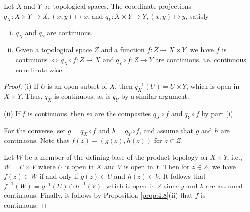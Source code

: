 \documentclass[a4paper,11pt]{article}
\begin{document}
\begin{proposition}\label{prop:4.9}
    Let $X$ and $Y$ be topological spaces. The coordinate projections $q_{X}: X \times Y \rightarrow X,(x, y) \mapsto x$, and $q_{Y}: X \times Y \rightarrow Y,(x, y) \mapsto y$, satisfy

    \begin{enumerate}[(i)]
        \item $q_{X}$ and $q_{Y}$ are continuous.

        \item Given a topological space $Z$ and a function $f: Z \rightarrow X \times Y$, we have $f$ is continuous $\Longleftrightarrow q_{X} \circ f: Z \rightarrow X$ and $q_{Y} \circ f: Z \rightarrow Y$ are continuous. i.e. continuous coordinate-wise. 
    \end{enumerate}
\end{proposition}
\begin{proof}
    (i) If $U$ is an open subset of $X$, then $q_{X}^{-1}(U)=U \times Y$, which is open in $X \times Y$. Thus, $q_{X}$ is continuous, as is $q_{Y}$ by a similar argument.

    (ii) If $f$ is continuous, then so are the composites $q_X \circ f$ and $q_{Y} \circ f$ by part (i). 
    
    For the converse, set $g=q_{X} \circ f$ and $h=q_{Y} \circ f$, and assume that $g$ and $h$ are continuous. Note that $f(z)=(g(z), h(z))$ for $z \in Z$. 
    
    Let $W$ be a member of the defining base of the product topology on $X \times Y$, i.e., $W=U \times V$ where $U$ is open in $X$ and $V$ is open in $Y$. Then for $z \in Z$, we have $f(z) \in W$ if and only if $g(z) \in U$ and $h(z) \in V$. It follows that $f^{-1}(W)=g^{-1}(U) \cap h^{-1}(V)$, which is open in $Z$ since $g$ and $h$ are assumed continuous. Finally, it follows by Proposition \ref{prop:4.8}(ii) that $f$ is continuous.
\end{proof}
\end{document}
